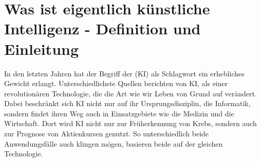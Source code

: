 \documentclass[12pt,german,ngerman]{report}
\begin{document}
    \tableofcontents
    \newpage


\chapter{Was ist eigentlich künstliche Intelligenz - Definition und Einleitung}


    In den letzten Jahren hat der Begriff der  (KI) als Schlagwort ein erhebliches Gewicht
    erlangt. Unterschiedlichste Quellen berichten von KI, als einer revolutionären Technologie, die die
    Art wie wir Leben von Grund auf verändert.
    Dabei beschränkt sich KI nicht nur auf ihr Ursprungsdisziplin, die Informatik, sondern findet ihren Weg auch in
    Einsatzgebiete wie die Medizin und die Wirtschaft. Dort wird KI nicht nur zur Früherkennung
    von Krebs, sondern auch zur Prognose von Aktienkursen genutzt. So unterschiedlich
    beide Anwendungsfälle auch klingen mögen, basieren beide auf der gleichen Technologie.\\
\end{document}

